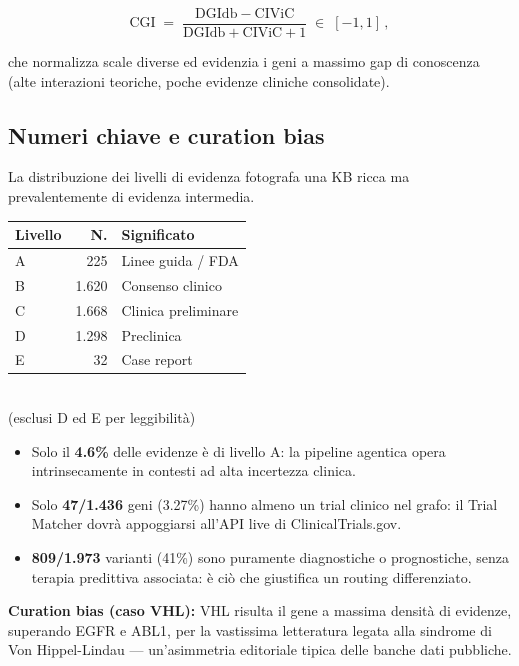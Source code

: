 \documentclass[11pt,a4paper]{article}
\begin{document}
\[
\mathrm{CGI} \;=\; \frac{\mathrm{DGIdb}-\mathrm{CIViC}}{\mathrm{DGIdb}+\mathrm{CIViC}+1}\;\in\;[-1,1]\,,
\]

che normalizza scale diverse ed evidenzia i geni a massimo gap di conoscenza (alte interazioni teoriche, poche evidenze cliniche consolidate).

\subsection{Numeri chiave e curation bias}
La distribuzione dei livelli di evidenza fotografa una KB ricca ma prevalentemente di evidenza intermedia.

\begin{center}
\small
\begin{minipage}[t]{0.46\textwidth}
\centering
\begin{tabular}{@{}lrl@{}}
\toprule
Livello & N. & Significato \\
\midrule
A & 225 & Linee guida / FDA \\
B & 1.620 & Consenso clinico \\
C & 1.668 & Clinica preliminare \\
D & 1.298 & Preclinica \\
E & 32 & Case report \\
\bottomrule
\end{tabular}
\end{minipage}\hfill
\begin{minipage}[t]{0.50\textwidth}
\centering
{}\\[-2pt]
{\footnotesize\sffamily\color{inkgray}(esclusi D ed E per leggibilit\`a)}
\end{minipage}
\end{center}

\begin{insightbox}
\begin{itemize}
\item Solo il \textbf{4.6\%} delle evidenze \`e di livello A: la pipeline agentica opera intrinsecamente in contesti ad alta incertezza clinica.
\item Solo \textbf{47/1.436} geni (3.27\%) hanno almeno un trial clinico nel grafo: il Trial Matcher dovr\`a appoggiarsi all'API live di ClinicalTrials.gov.
\item \textbf{809/1.973} varianti (41\%) sono puramente diagnostiche o prognostiche, senza terapia predittiva associata: \`e ci\`o che giustifica un routing differenziato.
\end{itemize}
\textbf{Curation bias (caso VHL):} VHL risulta il gene a massima densit\`a di evidenze, superando EGFR e ABL1, per la vastissima letteratura legata alla sindrome di Von Hippel-Lindau --- un'asimmetria editoriale tipica delle banche dati pubbliche.
\end{insightbox}
\end{document}
